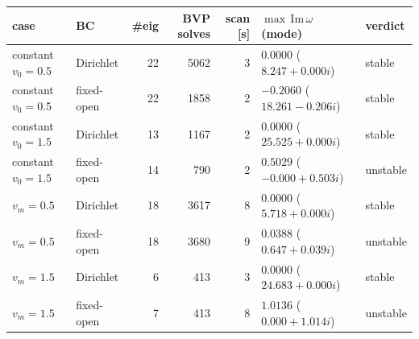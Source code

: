 \begin{tabular}{llrrrll}
\toprule
case & BC & \#eig & BVP solves & scan [s] & $\max\,\mathrm{Im}\,\omega$ (mode) & verdict\\
\midrule
constant $v_0=0.5$ & Dirichlet & 22 & 5062 & 3 & $0.0000$ ($8.247+0.000i$) & stable\\
constant $v_0=0.5$ & fixed-open & 22 & 1858 & 2 & $-0.2060$ ($18.261-0.206i$) & stable\\
constant $v_0=1.5$ & Dirichlet & 13 & 1167 & 2 & $0.0000$ ($25.525+0.000i$) & stable\\
constant $v_0=1.5$ & fixed-open & 14 & 790 & 2 & $0.5029$ ($-0.000+0.503i$) & unstable\\
$v_m=0.5$ & Dirichlet & 18 & 3617 & 8 & $0.0000$ ($5.718+0.000i$) & stable\\
$v_m=0.5$ & fixed-open & 18 & 3680 & 9 & $0.0388$ ($0.647+0.039i$) & unstable\\
$v_m=1.5$ & Dirichlet & 6 & 413 & 3 & $0.0000$ ($24.683+0.000i$) & stable\\
$v_m=1.5$ & fixed-open & 7 & 413 & 8 & $1.0136$ ($0.000+1.014i$) & unstable\\
\bottomrule
\end{tabular}
